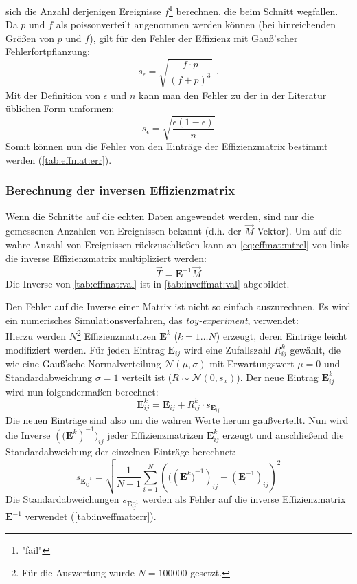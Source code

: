 sich die Anzahl derjenigen Ereignisse $f$\footnote{"fail"} berechnen, die beim Schnitt wegfallen. Da $p$ und $f$ als poissonverteilt angenommen 
werden können (bei hinreichenden Größen von $p$ und $f$), gilt für den Fehler der Effizienz mit Gauß'scher Fehlerfortpflanzung:
\begin{equation}
    s_\epsilon = \sqrt{\frac{f \cdot p}{ \left( f + p \right)^3}} \ \, .
\end{equation}
Mit der Definition von $\epsilon$ und $n$ kann man den Fehler zu der in der Literatur üblichen Form umformen:
\begin{equation}
    s_\epsilon = \sqrt{\frac{\epsilon (1-\epsilon)}{n}}
\end{equation}
Somit können nun die Fehler von den Einträge der Effizienzmatrix bestimmt werden (\autoref{tab:effmat:err}).

\subsubsection{Berechnung der inversen Effizienzmatrix}
Wenn die Schnitte auf die echten Daten angewendet werden, sind nur die gemessenen Anzahlen von Ereignissen bekannt 
(d.h. der $\vec{M}$-Vektor). Um auf die wahre Anzahl von Ereignissen rückzuschließen kann an \autoref{eq:effmat:mtrel} 
von links die inverse Effizienzmatrix multipliziert werden:
\begin{equation}
    \vec{T} = \bm{E}^{-1} \vec{M}
\end{equation}
Die Inverse von \autoref{tab:effmat:val} ist in \autoref{tab:inveffmat:val} abgebildet.

Den Fehler auf die Inverse einer Matrix ist nicht so einfach auszurechnen. Es wird ein numerisches Simulationsverfahren, 
das \emph{toy-experiment}, verwendet: \\
Hierzu werden $N$\footnote{Für die Auswertung wurde $N=100000$ gesetzt.} Effizienzmatrizen $\bm{E}^k$ ($k=1 \ldots N$) erzeugt, 
deren Einträge leicht modifiziert werden. Für jeden Eintrag $\bm{E}_{ij}$ wird eine Zufallszahl $R_{ij}^k$ 
gewählt, die wie eine Gauß'sche Normalverteilung $\mathcal{N}(\mu, \sigma)$ mit Erwartungswert $\mu = 0$ und 
Standardabweichung $\sigma = 1$ verteilt ist ($R \sim \mathcal{N}(0, s_x)$). Der neue Eintrag $\bm{E}_{ij}^k$ wird nun folgendermaßen berechnet:
\begin{equation}
    \bm{E}_{ij}^k = \bm{E}_{ij} + R_{ij}^k \cdot s_{\bm{E}_{ij}}
\end{equation}
Die neuen Einträge sind also um die wahren Werte herum gaußverteilt. Nun wird die Inverse $({(\bm{E}^k})^{-1})_{ij}$ jeder Effizienzmatrizen $\bm{E}^k_{ij}$ erzeugt und 
anschließend die Standardabweichung der einzelnen Einträge berechnet:
\begin{equation}
    s_{\bm{E}^{-1}_{ij}} = \sqrt{\frac{1}{N-1} \sum_{i=1}^{N} \left((({\bm{E}^k)}^{-1})_{ij} - (\bm{E}^{-1})_{ij} \right)^2 }
\end{equation}
Die Standardabweichungen $s_{\bm{E}^{-1}_{ij}}$ werden als Fehler auf die inverse Effizienzmatrix $\bm{E}^{-1}$ verwendet 
(\autoref{tab:inveffmat:err}).

